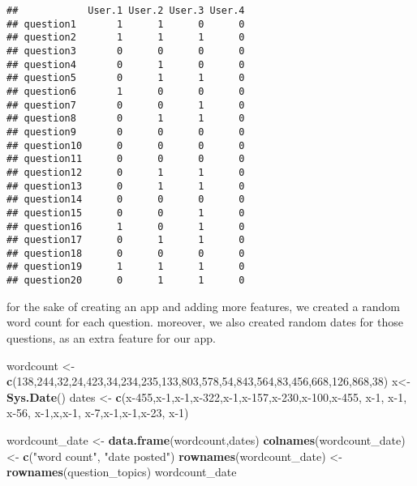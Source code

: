 \documentclass[]{article}
\newenvironment{Shaded}{\begin{snugshade}}{\end{snugshade}}
\newcommand{\DecValTok}[1]{\textcolor[rgb]{0.00,0.00,0.81}{#1}}
\newcommand{\KeywordTok}[1]{\textcolor[rgb]{0.13,0.29,0.53}{\textbf{#1}}}
\newcommand{\NormalTok}[1]{#1}
\newcommand{\StringTok}[1]{\textcolor[rgb]{0.31,0.60,0.02}{#1}}
\begin{document}
\begin{verbatim}
##            User.1 User.2 User.3 User.4
## question1       1      1      0      0
## question2       1      1      1      0
## question3       0      0      0      0
## question4       0      1      0      0
## question5       0      1      1      0
## question6       1      0      0      0
## question7       0      0      1      0
## question8       0      1      1      0
## question9       0      0      0      0
## question10      0      0      0      0
## question11      0      0      0      0
## question12      0      1      1      0
## question13      0      1      1      0
## question14      0      0      0      0
## question15      0      0      1      0
## question16      1      0      1      0
## question17      0      1      1      0
## question18      0      0      0      0
## question19      1      1      1      0
## question20      0      1      1      0
\end{verbatim}

for the sake of creating an app and adding more features, we created a
random word count for each question. moreover, we also created random
dates for those questions, as an extra feature for our app.

\begin{Shaded}
\begin{Highlighting}[]
\NormalTok{wordcount <-}\StringTok{ }\KeywordTok{c}\NormalTok{(}\DecValTok{138}\NormalTok{,}\DecValTok{244}\NormalTok{,}\DecValTok{32}\NormalTok{,}\DecValTok{24}\NormalTok{,}\DecValTok{423}\NormalTok{,}\DecValTok{34}\NormalTok{,}\DecValTok{234}\NormalTok{,}\DecValTok{235}\NormalTok{,}\DecValTok{133}\NormalTok{,}\DecValTok{803}\NormalTok{,}\DecValTok{578}\NormalTok{,}\DecValTok{54}\NormalTok{,}\DecValTok{843}\NormalTok{,}\DecValTok{564}\NormalTok{,}\DecValTok{83}\NormalTok{,}\DecValTok{456}\NormalTok{,}\DecValTok{668}\NormalTok{,}\DecValTok{126}\NormalTok{,}\DecValTok{868}\NormalTok{,}\DecValTok{38}\NormalTok{)}
\NormalTok{x<-}\KeywordTok{Sys.Date}\NormalTok{()}
\NormalTok{dates <-}\StringTok{ }\KeywordTok{c}\NormalTok{(x}\DecValTok{-455}\NormalTok{,x}\DecValTok{-1}\NormalTok{,x}\DecValTok{-1}\NormalTok{,x}\DecValTok{-322}\NormalTok{,x}\DecValTok{-1}\NormalTok{,x}\DecValTok{-157}\NormalTok{,x}\DecValTok{-230}\NormalTok{,x}\DecValTok{-100}\NormalTok{,x}\DecValTok{-455}\NormalTok{, x}\DecValTok{-1}\NormalTok{, x}\DecValTok{-1}\NormalTok{, x}\DecValTok{-56}\NormalTok{, x}\DecValTok{-1}\NormalTok{,x,x}\DecValTok{-1}\NormalTok{, x}\DecValTok{-7}\NormalTok{,x}\DecValTok{-1}\NormalTok{,x}\DecValTok{-1}\NormalTok{,x}\DecValTok{-23}\NormalTok{, x}\DecValTok{-1}\NormalTok{)}

\NormalTok{wordcount_date <-}\StringTok{ }\KeywordTok{data.frame}\NormalTok{(wordcount,dates)}
\KeywordTok{colnames}\NormalTok{(wordcount_date) <-}\StringTok{ }\KeywordTok{c}\NormalTok{(}\StringTok{"word count"}\NormalTok{, }\StringTok{"date posted"}\NormalTok{)}
\KeywordTok{rownames}\NormalTok{(wordcount_date) <-}\StringTok{ }\KeywordTok{rownames}\NormalTok{(question_topics)}
\NormalTok{wordcount_date}
\end{Highlighting}
\end{Shaded}
\end{document}
